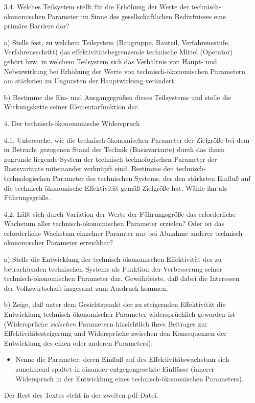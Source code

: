 \documentclass[11pt,a4paper]{article}
\begin{document}
3.4. Welches Teilsystem stellt für die Erhöhung der Werte der
technisch-ökonomischen Parameter im Sinne des gesellschaftlichen Bedürfnisses
eine primäre Barriere dar?

a) Stelle fest, zu welchem Teilsystem (Baugruppe, Bauteil, Verfahrensstufe,
Verfahrensschritt) das effektivitätsbegrenzende technische Mittel (Operator)
gehört bzw. in welchem Teilsystem sich das Verhältnis von Haupt- und
Nebenwirkung bei Erhöhung der Werte von technisch-ökonomischen Parametern am
stärksten zu Ungunsten der Hauptwirkung verändert.

b) Bestimme die Ein- und Ausgangegrößen dieses Teilsystems und stelle die
Wirkungskette seiner Elementarfunktion dar.

4. Der technisch-ökononomische Widerspruch

4.1. Untersuche, wie die technisch-ökonomischen Parameter der Zielgröße bei
dem in Betracht gezogenen Stand der Technik (Basisvariante) durch das ihnen
zugrunde liegende System der technisch-technologischen Parameter der
Basisvariante miteinander verknüpft sind. Bestimme den
technisch-technologischen Parameter des technischen Systems, der den stärksten
Einfluß auf die technisch-ökonomische Effektivität gemäß Zielgröße hat. Wähle
ihn als Führungsgröße.

4.2. Läßt sich durch Variation der Werte der Führungsgröße das erforderliche
Wachstum aller technisch-ökonomischen Parameter erzielen? Oder ist das
erforderliche Wachstum einzelner Paramter nur bei Abnahme anderer
technisch-ökonomischer Parameter erreichbar?

a) Stelle die Entwicklung der technisch-ökonomischen Effektivität des zu
betrachtenden technischen Systems als Funktion der Verbesserung seiner
technisch-ökonomischen Parameter dar. Gewährleiste, daß dabei die Interessen
der Volkswirtschaft insgesamt zum Ausdruck kommen.

b) Zeige, daß unter dem Gesichtspunkt der zu steigernden Effektivität die
Entwicklung tech\-nisch-ökonomischer Parameter widersprüchlich geworden ist
(Widersprüche \emph{zwischen} Parametern hinsichtlich ihres Beitrages zur
Effektivitätesteigerung und Widersprüche zwischen den Konsequenzen der
Entwicklung des einen oder anderen Parameters):
\begin{itemize} 
\item Nenne die Parameter, deren Einfluß auf des Effektivitätswachstum sich
  zunehmend spaltet in einander entgegengesetzte Einflüsse (innerer
  Widerspruch in der Entwicklung eines technisch-ökonomischen Parameters).
\end{itemize}

Der Rest des Textes steht in der zweiten pdf-Datei.
\end{document}
